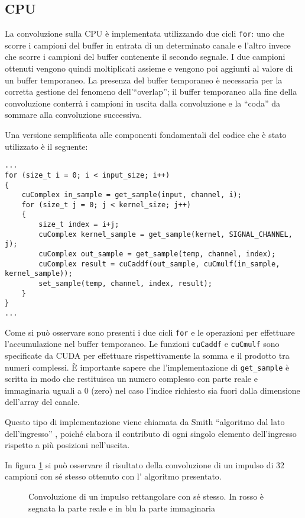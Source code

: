 \subsection{CPU}

La convoluzione sulla CPU è implementata utilizzando due cicli \lstinline{for}: uno che scorre i campioni del buffer in entrata di un determinato canale e l'altro invece che scorre i campioni del buffer contenente il secondo segnale. I due campioni ottenuti vengono quindi moltiplicati assieme e vengono poi aggiunti al valore di un buffer temporaneo. La presenza del buffer temporaneo è necessaria per la corretta gestione del fenomeno dell'``overlap''; il buffer temporaneo alla fine della convoluzione conterrà i campioni in uscita dalla convoluzione e la ``coda'' da sommare alla convoluzione successiva.

Una versione semplificata alle componenti fondamentali del codice che è stato utilizzato è il seguente:
\begin{lstlisting}
...
for (size_t i = 0; i < input_size; i++)
{
    cuComplex in_sample = get_sample(input, channel, i);
    for (size_t j = 0; j < kernel_size; j++)
    {
        size_t index = i+j;
        cuComplex kernel_sample = get_sample(kernel, SIGNAL_CHANNEL, j);
        cuComplex out_sample = get_sample(temp, channel, index);
        cuComplex result = cuCaddf(out_sample, cuCmulf(in_sample, kernel_sample));
        set_sample(temp, channel, index, result);
    }
}
...
\end{lstlisting}
Come si può osservare sono presenti i due cicli \lstinline{for} e le operazioni per effettuare l'accumulazione nel buffer temporaneo. Le funzioni \lstinline{cuCaddf} e \lstinline{cuCmulf} sono specificate da CUDA per effettuare rispettivamente la somma e il prodotto tra numeri complessi. È importante sapere che l'implementazione di \lstinline{get_sample} è scritta in modo che restituisca un numero complesso con parte reale e immaginaria uguali a $0$ (zero) nel caso l'indice richiesto sia fuori dalla dimensione dell'array del canale.

Questo tipo di implementazione viene chiamata da Smith ``algoritmo dal lato dell'ingresso'' \cite[pp.~112-115]{dspguide}, poiché elabora il contributo di ogni singolo elemento dell'ingresso rispetto a più posizioni nell'uscita.

In figura \ref{fig:pulse32conv} si può osservare il risultato della convoluzione di un impulso di 32 campioni con sé stesso ottenuto con l' algoritmo presentato.
\begin{figure}[h]
    \centering
    \caption{Convoluzione di un impulso rettangolare con sé stesso. In rosso è segnata la parte reale e in blu la parte immaginaria}
    \label{fig:pulse32conv}
\end{figure}

